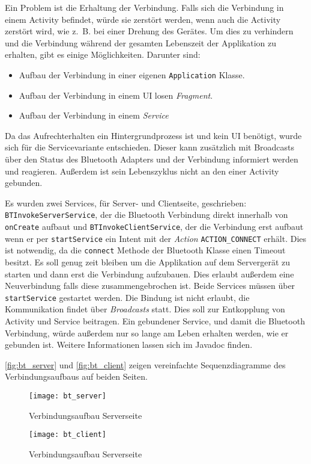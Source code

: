Ein Problem ist die Erhaltung der Verbindung. Falls sich die Verbindung in einem Activity befindet, würde sie zerstört werden, wenn auch die Activity zerstört wird, wie z.~B. bei einer Drehung des Gerätes. Um dies zu verhindern und die Verbindung während der gesamten Lebenszeit der Applikation zu erhalten, gibt es einige Möglichkeiten. Darunter sind:
\begin{itemize}
  \item Aufbau der Verbindung in einer eigenen \lstinline|Application| Klasse.
  \item Aufbau der Verbindung in einem UI losen \emph{Fragment}.~\cite{GoogleInc.2015a}
  \item Aufbau der Verbindung in einem \emph{Service}
\end{itemize}
Da das Aufrechterhalten ein Hintergrundprozess ist und kein UI benötigt, wurde sich für die Servicevariante entschieden. Dieser kann zusätzlich mit Broadcasts über den Status des Bluetooth Adapters und der Verbindung informiert werden und reagieren. Außerdem ist sein Lebenszyklus nicht an den einer Activity gebunden.

\begin{sloppypar}
Es wurden zwei Services, für Server- und Clientseite, geschrieben:
\lstinline|BTInvokeServerService|, der die Bluetooth Verbindung direkt innerhalb von \lstinline{onCreate} aufbaut und
\lstinline{BTInvokeClientService}, der die Verbindung erst aufbaut wenn er per \lstinline{startService} ein Intent mit der \emph{Action} \lstinline{ACTION_CONNECT} erhält. Dies ist notwendig, da die \lstinline{connect} Methode der Bluetooth Klasse einen Timeout besitzt. Es soll genug zeit bleiben um die Applikation auf dem Servergerät zu starten und dann erst die Verbindung aufzubauen. Dies erlaubt außerdem eine Neuverbindung falls diese zusammengebrochen ist. Beide Services müssen über \lstinline{startService} gestartet werden. Die Bindung ist nicht erlaubt, die Kommunikation findet über \emph{Broadcasts} statt. Dies soll zur Entkopplung von Activity und Service beitragen. Ein gebundener Service, und damit die Bluetooth Verbindung, würde außerdem nur so lange am Leben erhalten werden, wie er gebunden ist. Weitere Informationen lassen sich im Javadoc finden.
\end{sloppypar}

\autoref{fig:bt_server} und \autoref{fig:bt_client} zeigen vereinfachte Sequenzdiagramme des Verbindungsaufbaus auf beiden Seiten.
\begin{figure}[htbp]
  \centering
  \texttt{[image: bt\_server]}
  \caption{Verbindungsaufbau Serverseite}
  \label{fig:bt_server}
\end{figure}
\begin{figure}[htbp]
  \centering
  \texttt{[image: bt\_client]}
  \caption{Verbindungsaufbau Serverseite}
  \label{fig:bt_client}
\end{figure}
%
